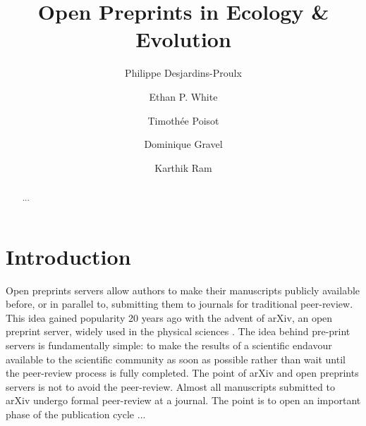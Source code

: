 \documentclass[letterpaper,twocolumn,superscriptaddress,showkeys]{revtex4}
\begin{document}
\title{Open Preprints in Ecology \& Evolution}

\author{Philippe Desjardins-Proulx}

\author{Ethan P. White}

\author{Timoth\'ee Poisot}

\author{Dominique Gravel}

\author{Karthik Ram}




\begin{abstract}

...
 
\end{abstract}

\maketitle

\section{Introduction}

Open preprints servers allow authors to make their manuscripts publicly available before, or in parallel to, submitting them to journals for traditional
peer-review. This idea gained popularity 20 years ago with the advent of arXiv, an open preprint server, widely used in the physical sciences \cite{gin11}. The idea behind pre-print servers is fundamentally simple: to make the results of a scientific endavour available to the scientific community as soon as possible rather than wait until the peer-review process is fully completed. The point of arXiv and open preprints servers is not to avoid the peer-review. Almost all manuscripts submitted to arXiv undergo formal peer-review at a journal. The point is to open an important phase of the publication cycle ...
\end{document}
